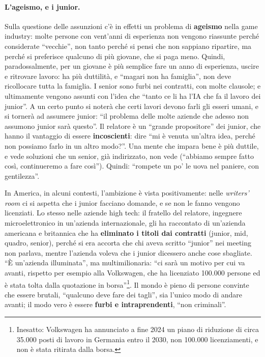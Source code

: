 \paragraph{L'ageismo, e i junior.} Sulla questione delle assunzioni c'è in
effetti un problema di \textbf{ageismo} nella game industry: molte persone con
vent'anni di esperienza non vengono riassunte perché considerate ``vecchie'',
non tanto perché si pensi che non sappiano ripartire, ma perché si preferisce
qualcuno di più giovane, che si paga meno. Quindi, paradossalmente, per un
giovane è più semplice fare un anno di esperienza, uscire e ritrovare lavoro:
ha più duttilità, e ``magari non ha famiglia'', non deve ricollocare tutta la
famiglia. I senior sono furbi nei contratti, con molte clausole; e ultimamente
vengono assunti con l'idea che ``tanto ce li ha l'IA che fa il lavoro dei
junior''. A un certo punto si noterà che certi lavori devono farli gli esseri
umani, e si tornerà ad assumere junior: ``il problema delle molte aziende che
adesso non assumono junior sarà questo''. Il relatore è un ``grande
propositore'' dei junior, che hanno il vantaggio di essere
\textbf{incoscienti}: dire ``mi è venuta un'altra idea, perché non possiamo
farlo in un altro modo?''. Una mente che impara bene è più duttile, e vede
soluzioni che un senior, già indirizzato, non vede (``abbiamo sempre fatto così,
continueremo a fare così''). Quindi: ``rompete un po' le uova nel paniere, con
gentilezza''.

In America, in alcuni contesti, l'ambizione è vista positivamente: nelle
\emph{writers' room} ci si aspetta che i junior facciano domande, e se non le
fanno vengono licenziati. Lo stesso nelle aziende high tech: il fratello del
relatore, ingegnere microelettronico in un'azienda internazionale, gli ha
raccontato di un'azienda americana e britannica che ha \textbf{eliminato i
titoli dai contratti} (junior, mid, quadro, senior), perché si era accorta che
chi aveva scritto ``junior'' nei meeting non parlava, mentre l'azienda voleva
che i junior dicessero anche cose sbagliate. ``È un'azienda illuminata'', ma
multimilionaria: ``ci sarà un motivo per cui va avanti, rispetto per esempio
alla Volkswagen, che ha licenziato 100.000 persone ed è stata tolta dalla
quotazione in borsa''\footnote{Inesatto: Volkswagen ha annunciato a fine 2024
un piano di riduzione di circa 35.000 posti di lavoro in Germania entro il
2030, non 100.000 licenziamenti, e non è stata ritirata dalla borsa.}. Il mondo
è pieno di persone convinte che essere brutali, ``qualcuno deve fare dei
tagli'', sia l'unico modo di andare avanti; il modo vero è essere
\textbf{furbi e intraprendenti}, ``non criminali''.

